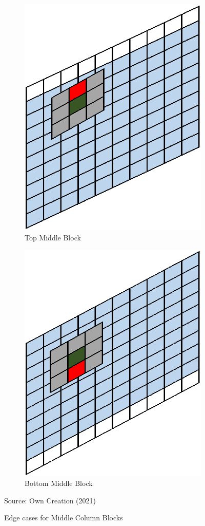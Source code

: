 \begin{figure}[H]
\centering
\begin{subfigure}{.4\textwidth}
  \centering
  \includegraphics[width=.5\linewidth]{Figures/Chapter3/topmid}
  \caption{Top Middle Block}
\end{subfigure}%
\begin{subfigure}{.4\textwidth}
  \centering
  \includegraphics[width=.5\linewidth]{Figures/Chapter3/botmid}
  \caption{Bottom Middle Block}
\end{subfigure}
\caption{Edge cases for Middle Column Blocks}
\begin{center}
Source: Own Creation (2021)
\end{center}
\label{fig:e3}
\end{figure}

